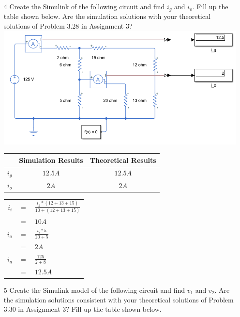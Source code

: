 \documentclass[a4paper]{article}
\begin{document}
\begin{itemize}
	\item[4] Create the Simulink of the following circuit and find $i_{g}$ and $i_{o}$. Fill up the table shown below. Are the simulation solutions with your theoretical solutions of Problem 3.28 in Assignment 3? 
	      \includegraphics[scale=0.5]{circuit-2.png} \\
	      \begin{tabular}{|c|c|c|}
	      	\hline
	      	        & Simulation Results & Theoretical Results \\
	      	\hline
	      	$i_{g}$ & $12.5A$            & $12.5A$             \\
	      	\hline
	      	$i_{o}$ & $2A$               & $2A$                \\
	      	\hline
	      \end{tabular} 
	      \begin{tabular}{rcl}
	      	$i_{i}$ & $=$ & $\frac{i_{g} * (12 + 13 + 15)}{10 + (12 + 13 + 15)}$ \\
	      	        & $=$ & $10A$                                                \\
	      	$i_{o}$ & $=$ & $\frac{i_{i} * 5}{20 + 5}$                           \\
	      	        & $=$ & $2A$                                                 \\
	      	$i_{g}$ & $=$ & $\frac{125}{2 + 8}$                                  \\
	      	        & $=$ & $12.5A$                                              \\
	      \end{tabular}
	\item[5] Create the Simulink model of the following circuit and find $v_{1}$ and $v_{2}$. Are the simulation solutions consistent with your theoretical solutions of Problem 3.30 in Assignment 3? Fill up the table shown below. \\

\end{itemize}
\end{document}
